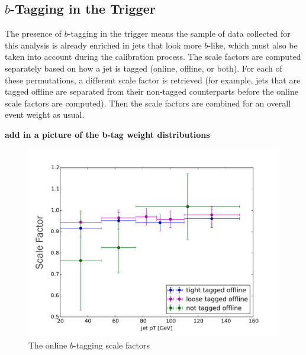 \subsection{$b$-Tagging in the Trigger}
The presence of $b$-tagging in the trigger means the sample of data collected for this 
analysis is already enriched in jets that look more $b$-like, which must also 
be taken into account during the calibration process.  The scale factors
are computed separately based on how a jet is tagged (online, offline, or both). 
For each of these permutations, a different scale factor is retrieved (for
example, jets that are tagged offline are separated from their non-tagged counterparts
before the online scale factors are computed).  Then the scale factors are combined
for an overall event weight as usual.  


\textbf{add in a picture of the b-tag weight distributions}



\begin{figure}
    \center
  \includegraphics[width=0.85\linewidth]{Systematics/online_SFs.pdf}
  \caption{The online $b$-tagging scale factors\label{fig:online_sfs}}    
\end{figure}                                                                                                                        








